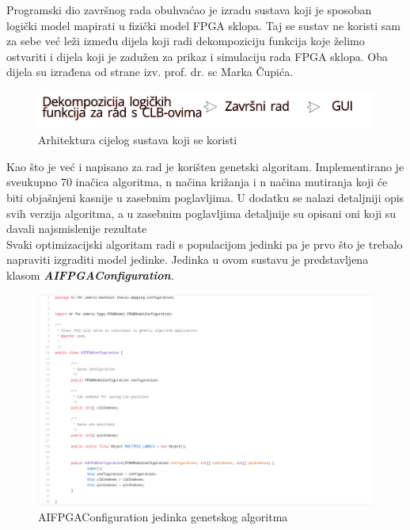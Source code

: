 \documentclass[times, utf8, zavrsni]{fer}
\begin{document}
Programski dio završnog rada obuhvaćao je izradu sustava koji je sposoban logički model mapirati u fizički model FPGA sklopa. Taj se sustav ne koristi sam za sebe već leži između dijela koji radi dekompoziciju funkcija koje želimo ostvariti i dijela koji je zadužen za prikaz i simulaciju rada FPGA sklopa. Oba dijela su izrađena od strane izv. prof. dr. sc Marka Čupića. 

\begin{figure}[!htb]
	\centering
	\includegraphics[width=15cm]{slike/arhitekturaSustava.png}
	\caption{Arhitektura cijelog sustava koji se koristi}
	\label{fig:arh-sustav}
\end{figure}


Kao što je već i napisano za rad je korišten genetski algoritam. Implementirano je sveukupno 70 inačica algoritma, n načina križanja i n načina mutiranja koji će biti objašnjeni kasnije u zasebnim poglavljima. U dodatku se nalazi detaljniji opis svih verzija algoritma, a u zasebnim poglavljima detaljnije su opisani oni koji su davali najsmislenije rezultate\\
Svaki optimizacijski algoritam radi s populacijom jedinki pa je prvo što je trebalo napraviti izgraditi model jedinke. Jedinka u ovom sustavu je predstavljena klasom \textbf{\emph{AIFPGAConfiguration}}. 

\begin{figure}[!htb]
	\centering
	\includegraphics[width=18cm]{slike/AIFPGAConf.png}
	\caption{AIFPGAConfiguration jedinka genetskog algoritma}
	\label{fig:ai-fpga}
\end{figure}
\end{document}
